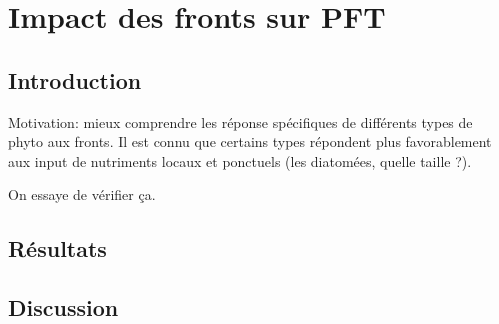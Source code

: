 
\chapter{Impact des fronts sur PFT}
\label{chp:res-pft}

\section{Introduction}

Motivation: mieux comprendre les réponse spécifiques de différents types de phyto aux fronts.
Il est connu que certains types répondent plus favorablement aux input de nutriments locaux et ponctuels (les diatomées, quelle taille ?).

On essaye de vérifier ça.

\section{Résultats}

\section{Discussion}
